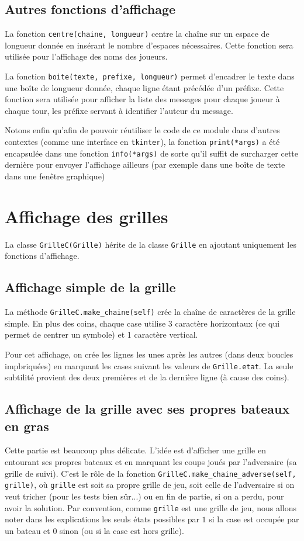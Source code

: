 \subsection{Autres fonctions d'affichage}
La fonction \texttt{centre(chaine, longueur)} centre la chaîne sur un espace de longueur donnée en insérant le nombre d'espaces nécessaires. Cette fonction sera utilisée pour l'affichage des noms des joueurs.

La fonction \texttt{boite(texte, prefixe, longueur)} permet d'encadrer le texte dans une boîte de longueur donnée, chaque ligne étant précédée d'un préfixe. Cette fonction sera utilisée pour afficher la liste des messages pour chaque joueur à chaque tour, les préfixe servant à identifier l'auteur du message.

Notons enfin qu'afin de pouvoir réutiliser le code de ce module dans d'autres contextes (comme une interface en \texttt{tkinter}), la fonction \texttt{print(*args)} a été encapsulée dans une fonction \texttt{info(*args)} de sorte qu'il suffit de surcharger cette dernière pour envoyer l'affichage ailleurs (par exemple dans une boîte de texte dans une fenêtre graphique)

\section{Affichage des grilles}
La classe \texttt{GrilleC(Grille)} hérite de la classe \texttt{Grille} en ajoutant uniquement les fonctions d'affichage.

\subsection{Affichage simple de la grille}
La méthode \texttt{GrilleC.make\_chaine(self)} crée la chaîne de caractères de la grille simple. En plus des coins, chaque case utilise 3 caractère horizontaux (ce qui permet de centrer un symbole) et 1 caractère vertical.

Pour cet affichage, on crée les lignes les unes après les autres (dans deux boucles impbriquées) en marquant les cases suivant les valeurs de \texttt{Grille.etat}. La seule subtilité provient des deux premières et de la dernière ligne (à cause des coins).


\subsection{Affichage de la grille avec ses propres bateaux en gras}
Cette partie est beaucoup plus délicate. L'idée est d'afficher une grille en entourant ses propres bateaux et en marquant les coups joués par l'adversaire (sa grille de suivi). C'est le rôle de la fonction \texttt{GrilleC.make\_chaine\_adverse(self, grille)}, où \texttt{grille} est soit sa propre grille de jeu, soit celle de l'adversaire si on veut tricher (pour les tests bien sûr...) ou en fin de partie, si on a perdu, pour avoir la solution. Par convention, comme \texttt{grille} est une grille de jeu, nous allons noter dans les explications les seuls états possibles par $1$ si la case est occupée par un bateau et $0$ sinon (ou si la case est hors grille).

